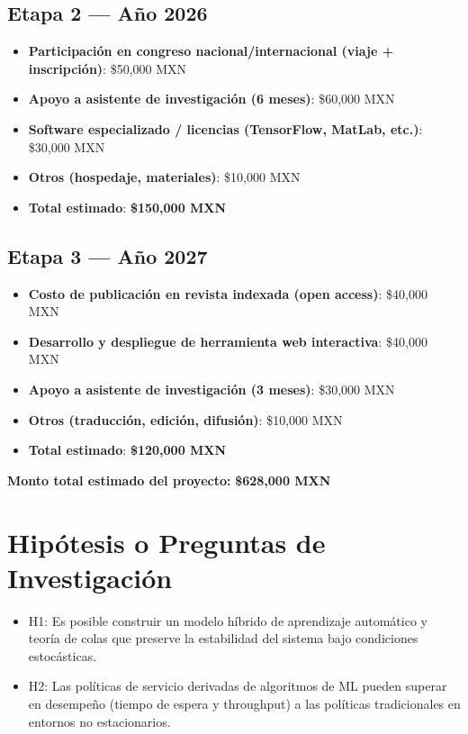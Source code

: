 \documentclass[12pt]{article}
\begin{document}
\subsection*{Etapa 2 — Año 2026}
\begin{itemize}
  \item \textbf{Participación en congreso nacional/internacional (viaje + inscripción)}: \$50,000 MXN
  \item \textbf{Apoyo a asistente de investigación (6 meses)}: \$60,000 MXN
  \item \textbf{Software especializado / licencias (TensorFlow, MatLab, etc.)}: \$30,000 MXN
  \item \textbf{Otros (hospedaje, materiales)}: \$10,000 MXN
  \item \textbf{Total estimado}: \textbf{\$150,000 MXN}
\end{itemize}

\subsection*{Etapa 3 — Año 2027}
\begin{itemize}
  \item \textbf{Costo de publicación en revista indexada (open access)}: \$40,000 MXN
  \item \textbf{Desarrollo y despliegue de herramienta web interactiva}: \$40,000 MXN
  \item \textbf{Apoyo a asistente de investigación (3 meses)}: \$30,000 MXN
  \item \textbf{Otros (traducción, edición, difusión)}: \$10,000 MXN
  \item \textbf{Total estimado}: \textbf{\$120,000 MXN}
\end{itemize}

\textbf{Monto total estimado del proyecto:} \textbf{\$628,000 MXN}


\section{Hipótesis o Preguntas de Investigación}
\begin{itemize}
  \item H1: Es posible construir un modelo híbrido de aprendizaje automático y teoría de colas que preserve la estabilidad del sistema bajo condiciones estocásticas.
  \item H2: Las políticas de servicio derivadas de algoritmos de ML pueden superar en desempeño (tiempo de espera y throughput) a las políticas tradicionales en entornos no estacionarios.
\end{itemize}
\end{document}
